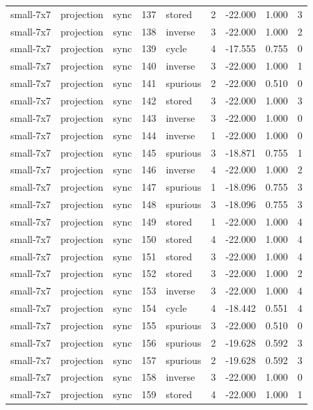 \begin{tabular}{lllrlrrrr}
small-7x7 & projection & sync & 137 & stored & 2 & -22.000 & 1.000 & 3 \\
small-7x7 & projection & sync & 138 & inverse & 3 & -22.000 & 1.000 & 2 \\
small-7x7 & projection & sync & 139 & cycle & 4 & -17.555 & 0.755 & 0 \\
small-7x7 & projection & sync & 140 & inverse & 3 & -22.000 & 1.000 & 1 \\
small-7x7 & projection & sync & 141 & spurious & 2 & -22.000 & 0.510 & 0 \\
small-7x7 & projection & sync & 142 & stored & 3 & -22.000 & 1.000 & 3 \\
small-7x7 & projection & sync & 143 & inverse & 3 & -22.000 & 1.000 & 0 \\
small-7x7 & projection & sync & 144 & inverse & 1 & -22.000 & 1.000 & 0 \\
small-7x7 & projection & sync & 145 & spurious & 3 & -18.871 & 0.755 & 1 \\
small-7x7 & projection & sync & 146 & inverse & 4 & -22.000 & 1.000 & 2 \\
small-7x7 & projection & sync & 147 & spurious & 1 & -18.096 & 0.755 & 3 \\
small-7x7 & projection & sync & 148 & spurious & 3 & -18.096 & 0.755 & 3 \\
small-7x7 & projection & sync & 149 & stored & 1 & -22.000 & 1.000 & 4 \\
small-7x7 & projection & sync & 150 & stored & 4 & -22.000 & 1.000 & 4 \\
small-7x7 & projection & sync & 151 & stored & 3 & -22.000 & 1.000 & 4 \\
small-7x7 & projection & sync & 152 & stored & 3 & -22.000 & 1.000 & 2 \\
small-7x7 & projection & sync & 153 & inverse & 3 & -22.000 & 1.000 & 4 \\
small-7x7 & projection & sync & 154 & cycle & 4 & -18.442 & 0.551 & 4 \\
small-7x7 & projection & sync & 155 & spurious & 3 & -22.000 & 0.510 & 0 \\
small-7x7 & projection & sync & 156 & spurious & 2 & -19.628 & 0.592 & 3 \\
small-7x7 & projection & sync & 157 & spurious & 2 & -19.628 & 0.592 & 3 \\
small-7x7 & projection & sync & 158 & inverse & 3 & -22.000 & 1.000 & 0 \\
small-7x7 & projection & sync & 159 & stored & 4 & -22.000 & 1.000 & 1 \\

\end{tabular}
